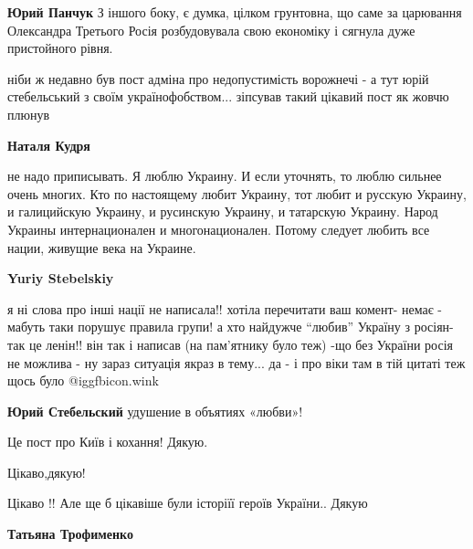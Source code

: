 \begin{itemize}
\begin{itemize} %
\textbf{Юрий Панчук} З іншого боку, є думка, цілком грунтовна, що саме за царювання Олександра Третього Росія розбудовувала свою економіку і сягнула дуже пристойного рівня.
\end{itemize} %


ніби ж недавно був пост адміна про недопустимість ворожнечі - а тут юрій
стебельський з своїм українофобством... зіпсував такий цікавий пост як жовчю
плюнув

\begin{itemize} %
\textbf{Наталя Кудря} 

не надо приписывать. Я люблю Украину. И если уточнять, то люблю сильнее очень
многих.  Кто по настоящему любит Украину, тот любит и русскую Украину, и
галицийскую Украину, и русинскую Украину, и татарскую Украину.  Народ Украины
интернационален и многонационален. Потому следует любить все нации, живущие
века на Украине.

\begin{itemize} %
\textbf{Yuriy Stebelskiy} 

я ні слова про інші нації не написала!! хотіла перечитати ваш комент- немає -
мабуть таки порушує правила групи! а хто найдужче \enquote{любив} Україну з росіян- так
це ленін!! він так і написав (на пам'ятнику було теж) -що без України росія не
можлива - ну зараз ситуація якраз в тему... да - і про віки там в тій цитаті теж
щось було  @igg{fbicon.wink} 


\textbf{Юрий Стебельский} удушение в объятиях «любви»!
\end{itemize} %

\end{itemize} %

Це пост про Київ і кохання! Дякую.

Цікаво,дякую!

Цікаво !! Але ще б цікавіше були історіїї героїв України.. Дякую

\begin{itemize} %
\textbf{Татьяна Трофименко} 


\end{itemize}
\end{itemize}
